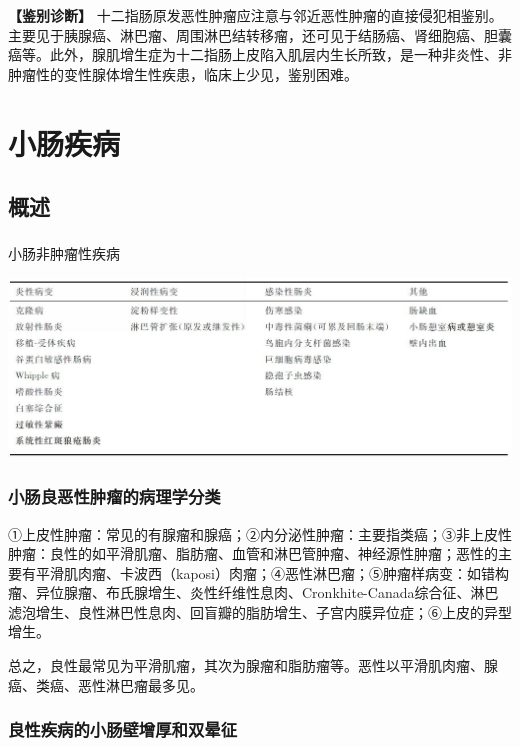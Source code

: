 \textbf{【鉴别诊断】}
十二指肠原发恶性肿瘤应注意与邻近恶性肿瘤的直接侵犯相鉴别。主要见于胰腺癌、淋巴瘤、周围淋巴结转移瘤，还可见于结肠癌、肾细胞癌、胆囊癌等。此外，腺肌增生症为十二指肠上皮陷入肌层内生长所致，是一种非炎性、非肿瘤性的变性腺体增生性疾患，临床上少见，鉴别困难。

\section{小肠疾病}

\subsection{概述}

\subsubsection{}

\begin{table}[htbp]
\centering
\caption{小肠非肿瘤性疾病}
\label{tab17-1}
\includegraphics[width=\textwidth,height=\textheight,keepaspectratio]{./images/Image00363.jpg}
\end{table}

\subsubsection{小肠良恶性肿瘤的病理学分类}

①上皮性肿瘤：常见的有腺瘤和腺癌；②内分泌性肿瘤：主要指类癌；③非上皮性肿瘤：良性的如平滑肌瘤、脂肪瘤、血管和淋巴管肿瘤、神经源性肿瘤；恶性的主要有平滑肌肉瘤、卡波西（kaposi）肉瘤；④恶性淋巴瘤；⑤肿瘤样病变：如错构瘤、异位腺瘤、布氏腺增生、炎性纤维性息肉、Cronkhite-Canada综合征、淋巴滤泡增生、良性淋巴性息肉、回盲瓣的脂肪增生、子宫内膜异位症；⑥上皮的异型增生。

总之，良性最常见为平滑肌瘤，其次为腺瘤和脂肪瘤等。恶性以平滑肌肉瘤、腺癌、类癌、恶性淋巴瘤最多见。

\subsubsection{良性疾病的小肠壁增厚和双晕征}

